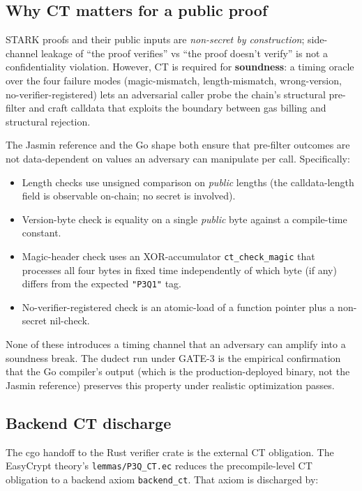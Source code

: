 \subsection{Why CT matters for a public proof}

STARK proofs and their public inputs are \emph{non-secret by
construction}; side-channel leakage of ``the proof verifies'' vs
``the proof doesn't verify'' is not a confidentiality violation.
However, CT is required for \textbf{soundness}: a timing oracle
over the four failure modes (magic-mismatch, length-mismatch,
wrong-version, no-verifier-registered) lets an adversarial caller
probe the chain's structural pre-filter and craft calldata that
exploits the boundary between gas billing and structural
rejection.

The Jasmin reference and the Go shape both ensure that pre-filter
outcomes are not data-dependent on values an adversary can
manipulate per call. Specifically:

\begin{itemize}[leftmargin=2em,nosep]
\item Length checks use unsigned comparison on \emph{public}
  lengths (the calldata-length field is observable on-chain; no
  secret is involved).
\item Version-byte check is equality on a single \emph{public}
  byte against a compile-time constant.
\item Magic-header check uses an XOR-accumulator
  \texttt{ct\_check\_magic} that processes all four bytes in
  fixed time independently of which byte (if any) differs from
  the expected \texttt{"P3Q1"} tag.
\item No-verifier-registered check is an atomic-load of a function
  pointer plus a non-secret nil-check.
\end{itemize}

None of these introduces a timing channel that an adversary can
amplify into a soundness break. The dudect run under GATE-3 is the
empirical confirmation that the Go compiler's output (which is the
production-deployed binary, not the Jasmin reference) preserves
this property under realistic optimization passes.

\subsection{Backend CT discharge}

The cgo handoff to the Rust verifier crate is the external CT
obligation. The EasyCrypt theory's \texttt{lemmas/P3Q\_CT.ec}
reduces the precompile-level CT obligation to a backend axiom
\texttt{backend\_ct}. That axiom is discharged by:

